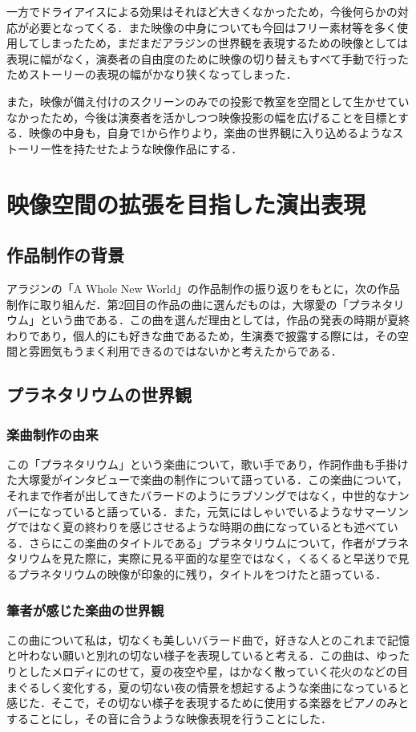 一方でドライアイスによる効果はそれほど大きくなかったため，今後何らかの対応が必要となってくる．また映像の中身についても今回はフリー素材等を多く使用してしまったため，まだまだアラジンの世界観を表現するための映像としては表現に幅がなく，演奏者の自由度のために映像の切り替えもすべて手動で行ったためストーリーの表現の幅がかなり狭くなってしまった．

また，映像が備え付けのスクリーンのみでの投影で教室を空間として生かせていなかったため，今後は演奏者を活かしつつ映像投影の幅を広げることを目標とする．映像の中身も，自身で1から作りより，楽曲の世界観に入り込めるようなストーリー性を持たせたような映像作品にする．


\section{映像空間の拡張を目指した演出表現}
\subsection{作品制作の背景}
アラジンの「A Whole New World」の作品制作の振り返りをもとに，次の作品制作に取り組んだ．第2回目の作品の曲に選んだものは，大塚愛の「プラネタリウム」という曲である\cite{Planetarium}．この曲を選んだ理由としては，作品の発表の時期が夏終わりであり，個人的にも好きな曲であるため，生演奏で披露する際には，その空間と雰囲気もうまく利用できるのではないかと考えたからである．

\subsection{プラネタリウムの世界観}
\subsubsection{楽曲制作の由来}
この「プラネタリウム」という楽曲について，歌い手であり，作詞作曲も手掛けた大塚愛がインタビューで楽曲の制作について語っている\cite{interview}．この楽曲について，それまで作者が出してきたバラードのようにラブソングではなく，中世的なナンバーになっていると語っている．また，元気にはしゃいでいるようなサマーソングではなく夏の終わりを感じさせるような時期の曲になっているとも述べている．さらにこの楽曲のタイトルである」プラネタリウムについて，作者がプラネタリウムを見た際に，実際に見る平面的な星空ではなく，くるくると早送りで見るプラネタリウムの映像が印象的に残り，タイトルをつけたと語っている．

\subsubsection{筆者が感じた楽曲の世界観}
この曲について私は，切なくも美しいバラード曲で，好きな人とのこれまで記憶と叶わない願いと別れの切ない様子を表現していると考える．この曲は、ゆったりとしたメロディにのせて，夏の夜空や星，はかなく散っていく花火のなどの目まぐるしく変化する，夏の切ない夜の情景を想起するような楽曲になっていると感じた．そこで，その切ない様子を表現するために使用する楽器をピアノのみとすることにし，その音に合うような映像表現を行うことにした．

